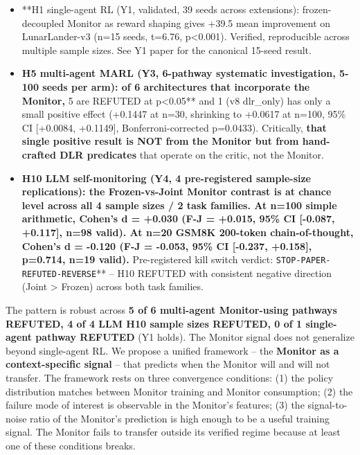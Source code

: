 \documentclass[11pt]{article}
\begin{document}
\begin{itemize}

\item
  **H1 single-agent RL (Y1, validated, 39 seeds across extensions):
  frozen-decoupled Monitor as reward shaping gives +39.5 mean
  improvement on LunarLander-v3 (n=15 seeds, t=6.76, p\textless0.001).
  Verified, reproducible across multiple sample sizes. See Y1 paper for
  the canonical 15-seed result.
\item
  \textbf{H5 multi-agent MARL (Y3, 6-pathway systematic investigation,
  5-100 seeds per arm): of 6 architectures that incorporate the Monitor,
  }5 are REFUTED at p\textless0.05** and 1 (v8 dlr\_only) has only a
  small positive effect (+0.1447 at n=30, shrinking to +0.0617 at n=100,
  95\% CI {[}+0.0084, +0.1149{]}, Bonferroni-corrected p=0.0433).
  Critically, \textbf{that single positive result is NOT from the
  Monitor but from hand-crafted DLR predicates} that operate on the
  critic, not the Monitor.
\item
  \textbf{H10 LLM self-monitoring (Y4, 4 pre-registered sample-size
  replications): the Frozen-vs-Joint Monitor contrast is at chance level
  across all 4 sample sizes / 2 task families. At n=100 simple
  arithmetic, Cohen's d = +0.030 (F-J = +0.015, 95\% CI {[}-0.087,
  +0.117{]}, n=98 valid). At n=20 GSM8K 200-token chain-of-thought,
  Cohen's d = -0.120 (F-J = -0.053, 95\% CI {[}-0.237, +0.158{]},
  p=0.714, n=19 valid). }Pre-registered kill switch verdict:
  \texttt{STOP-PAPER-REFUTED-REVERSE}** -- H10 REFUTED with consistent
  negative direction (Joint \textgreater{} Frozen) across both task
  families.
\end{itemize}

The pattern is robust across \textbf{5 of 6 multi-agent Monitor-using
pathways REFUTED, 4 of 4 LLM H10 sample sizes REFUTED, 0 of 1
single-agent pathway REFUTED} (Y1 holds). The Monitor signal does not
generalize beyond single-agent RL. We propose a unified framework -- the
\textbf{Monitor as a context-specific signal} -- that predicts when the
Monitor will and will not transfer. The framework rests on three
convergence conditions: (1) the policy distribution matches between
Monitor training and Monitor consumption; (2) the failure mode of
interest is observable in the Monitor's features; (3) the
signal-to-noise ratio of the Monitor's prediction is high enough to be a
useful training signal. The Monitor fails to transfer outside its
verified regime because at least one of these conditions breaks.
\end{document}
